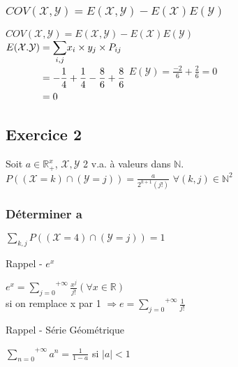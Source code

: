 \documentclass[a4paper, 12pt]{article}
\begin{document}
\subsubsection{$COV (\mathcal{X, Y}) = E (\mathcal{X, Y}) - E (\mathcal{X}) E (\mathcal{Y})$}
$COV (\mathcal{X, Y}) = E (\mathcal{X, Y}) - E (\mathcal{X}) E (\mathcal{Y})$\\
$
\begin{aligned}
E (\mathcal{X . Y}) &= \underset{i, j}{\sum} x_i \times y_j \times P_{ij} \\
&= -\frac{1}{4} + \frac{1}{4} - \frac{8}{6} + \frac{8}{6} \\
&= 0
\end{aligned}\\
$
$E (\mathcal{Y}) = \frac{-2}{6} + \frac{2}{6} = 0$



\subsection{Exercice 2}
Soit $a \in \mathbb{R}^{x}_{+}$, $\mathcal{X, Y}$ 2 v.a. à valeurs dans $\mathbb{N}$.\\
$P ((\mathcal{X} = k) \cap (\mathcal{Y} = j)) = \frac{a}{2^{k + 1} (j!)}$ $\forall (k, j) \in \mathbb{N}^2$


\subsubsection{Déterminer a}
$\underset{k, j}{\sum} P ((\mathcal{X} = 4) \cap (\mathcal{Y} = j)) = 1$\\

\begin{rappel}{Rappel - $e^x$}
\begin{center}
$e^x = \overset{+\infty}{\underset{j = 0}{\sum}} \frac{x^j}{j!} (\forall x \in \mathbb{R})$\\
si on remplace x par 1 $\Rightarrow e = \overset{+\infty}{\underset{j = 0}{\sum}} \frac{1}{j!}$
\end{center}
\end{rappel}

\begin{rappel}{Rappel - Série Géométrique}
\begin{center}
$\overset{+\infty}{\underset{n = 0}{\sum}} a^n = \frac{1}{1 - a}$ si $|a| < 1$
\end{center}
\end{rappel}
\end{document}
